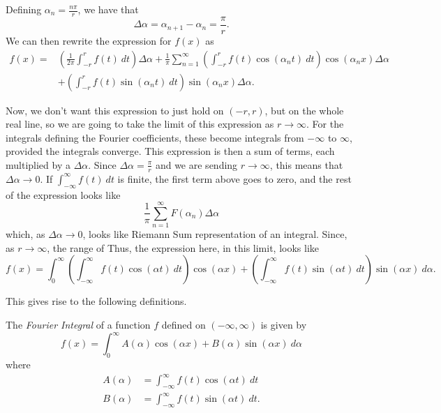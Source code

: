 \documentclass{ximera}
\begin{document}
Defining $\alpha_n = \frac{n\pi}{r}$, we have that 
\[ 
    \Delta \alpha = \alpha_{n+1} - \alpha_n = \frac{\pi}{r}. 
\] 
We can then rewrite the expression for $f(x)$ as 
\[ 
    \begin{split} 
        f(x) =&  \left( \frac{1}{2\pi} \int_{-r}^{r} f(t)\ dt \right) \Delta \alpha  + \frac{1}{\pi} \sum_{n=1}^\infty \left( \int_{-r}^r f(t) \cos\left(\alpha_n t\right)\ dt\right) \cos\left(\alpha_n x\right) \Delta \alpha  \\
        &+ \left(\int_{-r}^r f(t) \sin\left(\alpha_n t\right)\ dt\right) \sin\left(\alpha_n x\right) \Delta \alpha.
    \end{split} 
\]

Now, we don't want this expression to just hold on $(-r, r)$, but on the whole real line, so we are going to take the limit of this expression as $r \rightarrow \infty$. For the integrals defining the Fourier coefficients, these become integrals from $-\infty$ to $\infty$, provided the integrals converge. This expression is then a sum of terms, each multiplied by a $\Delta \alpha$. Since $\Delta \alpha = \frac{\pi}{r}$ and we are sending $r\rightarrow \infty$, this means that $\Delta \alpha \rightarrow 0$. If $\int_{-\infty}^\infty f(t)\ dt$ is finite, the first term above goes to zero, and the rest of the expression looks like
\[ 
    \frac{1}{\pi} \sum_{n=1}^\infty F(\alpha_n) \Delta \alpha 
\] 
which, as $\Delta \alpha \rightarrow 0$, looks like Riemann Sum representation of an integral. Since, as $r \rightarrow \infty$, the range of Thus, the expression here, in this limit, looks like
\[ 
    f(x) = \int_0^\infty \left( \int_{-\infty}^\infty f(t) \cos\left(\alpha t\right)\ dt\right) \cos\left(\alpha x\right) + \left( \int_{-\infty}^\infty f(t) \sin\left(\alpha t\right)\ dt\right) \sin\left(\alpha x\right) \ d\alpha. 
\]

This gives rise to the following definitions.

\begin{definition}
    The \emph{Fourier Integral} of a function $f$ defined on $(-\infty, \infty)$ is given by 
    \[ 
        f(x) = \int_0^\infty A(\alpha) \cos\left( \alpha x\right) + B(\alpha) \sin\left(\alpha x \right)\ d\alpha 
    \] 
    where
    \[ 
        \begin{split} 
            A(\alpha) &=  \int_{-\infty}^\infty f(t) \cos\left(\alpha t\right)\ dt \\ 
            B(\alpha) &= \int_{-\infty}^\infty f(t) \sin\left(\alpha t\right)\ dt. 
        \end{split} 
    \]
\end{definition}
\end{document}
